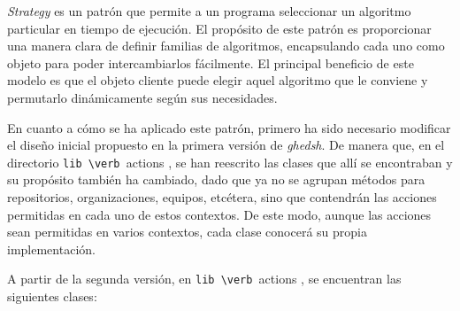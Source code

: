 {\it Strategy} es un patrón que permite a un programa seleccionar un algoritmo particular en tiempo de ejecución. El propósito de este patrón es proporcionar una manera clara 
de definir familias de algoritmos, encapsulando cada uno como objeto para poder intercambiarlos fácilmente. El principal beneficio de este modelo es que el objeto cliente puede elegir aquel algoritmo que le conviene y
permutarlo dinámicamente según sus necesidades.
\bigskip

En cuanto a cómo se ha aplicado este patrón, primero ha sido necesario modificar el diseño inicial propuesto en la primera versión de {\it ghedsh}.
De manera que, en el directorio \verb /lib \verb /actions , se han reescrito las clases que allí se encontraban y su propósito también ha cambiado, dado que ya no se agrupan métodos para repositorios, organizaciones, equipos, etcétera, sino que
contendrán las acciones permitidas en cada uno de estos contextos. De este modo, aunque las acciones sean permitidas en varios contextos, cada clase conocerá su propia implementación.
\bigskip

A partir de la segunda versión, en \verb /lib \verb /actions , se encuentran las siguientes clases:
\bigskip

